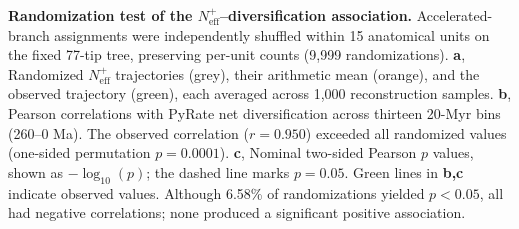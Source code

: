 \noindent\textbf{Randomization test of the $N_{\mathrm{eff}}^{+}$--diversification association.}
Accelerated-branch assignments were independently shuffled within 15 anatomical units on the fixed 77-tip tree, preserving per-unit counts (9,999 randomizations).
\textbf{a}, Randomized $N_{\mathrm{eff}}^{+}$ trajectories (grey), their arithmetic mean (orange), and the observed trajectory (green), each averaged across 1,000 reconstruction samples.
\textbf{b}, Pearson correlations with PyRate net diversification across thirteen 20-Myr bins (260--0 Ma). The observed correlation ($r=0.950$) exceeded all randomized values (one-sided permutation $p=0.0001$).
\textbf{c}, Nominal two-sided Pearson $p$ values, shown as $-\log_{10}(p)$; the dashed line marks $p=0.05$. Green lines in \textbf{b,c} indicate observed values. Although 6.58\% of randomizations yielded $p<0.05$, all had negative correlations; none produced a significant positive association.
